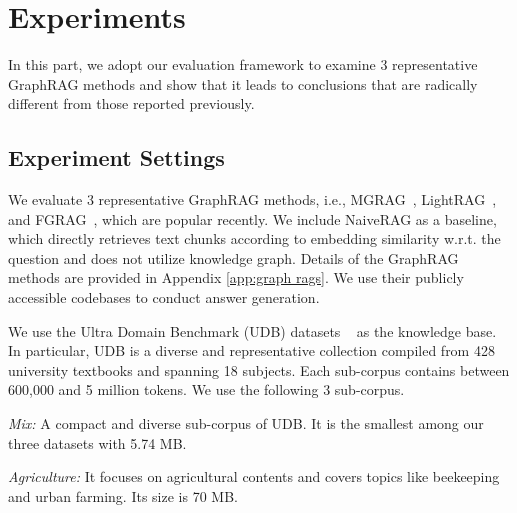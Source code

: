 \section{Experiments}

In this part, we adopt our evaluation framework to examine 3 representative GraphRAG methods and show that it leads to conclusions that are radically different from those reported previously.

\subsection{Experiment Settings}
 We evaluate 3 representative GraphRAG methods, i.e., MGRAG~\cite{edge2024local}, LightRAG~\cite{guo2024lightrag}, and FGRAG~\cite{fastgraphrag2024}, which are popular recently. We include NaiveRAG as a baseline, which directly retrieves text chunks according to embedding similarity w.r.t. the question and does not utilize knowledge graph. Details of the GraphRAG methods are provided in Appendix \ref{app:graph rags}. We use their publicly accessible codebases to conduct answer generation.


We use the Ultra Domain Benchmark (UDB) datasets ~\cite{qian2024memorag} as the knowledge base. In particular, UDB is a diverse and representative collection compiled from 428 university textbooks and spanning 18 subjects. Each sub-corpus contains between 600,000 and 5 million tokens. We use the following 3 sub-corpus.

\squishlist
    \item {\textit{Mix:}}
    A compact and diverse sub-corpus of UDB. It is the smallest among our three datasets with 5.74 MB.
    \item {\textit{Agriculture:}} It focuses on agricultural contents and covers topics like beekeeping and urban farming. Its size is 70 MB.

